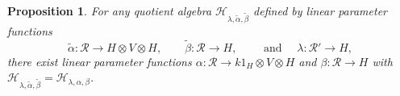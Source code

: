 \documentclass[10pt,a4paper]{amsart}
\newtheorem{prop}{Proposition}
\newcommand{\R}{\mathcal{R}}
\newcommand{\cH}{\mathcal{H}}
\newcommand{\chabl}{\cH_{\lambda,\alpha,\beta}}
\newcommand{\ot}{\otimes}
\begin{document}
     \begin{prop}\label{ChoiceParameterCodomain}
      For any quotient algebra $\cH_{\lambda,\tilde\alpha, \tilde \beta}$
      defined by linear parameter functions
        $$\tilde\alpha: \R\rightarrow H\ot V\ot H, \qquad 
        \tilde\beta: \R\rightarrow H, \qquad\text{ and }\quad
        \lambda:\R'\rightarrow H, 
     $$
 there exist linear parameter functions 
     $\alpha: \R\rightarrow k1_H\ot V\ot H$ and 
     $\beta: \R\rightarrow H$
with
$ \cH_{\lambda, \tilde\alpha, \tilde \beta} = \chabl$.
\end{prop}
\end{document}
